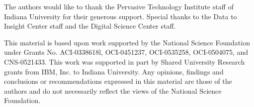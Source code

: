 \documentclass[10pt,conference]{IEEEtran}
\begin{document}
The authors would like to thank the Pervasive Technology Institute staff of Indiana University for their generous support. Special thanks to the Data to Insight Center staff and the Digital Science Center staff. 

This material is based upon work supported by the National Science Foundation under Grants No. ACI-0338618l, OCI-0451237, OCI-0535258, OCI-0504075, and CNS-0521433. This work was supported in part by Shared University Research grants from IBM, Inc. to Indiana University. Any opinions, findings and conclusions or recommendations expressed in this material are those of the authors and do not necessarily reflect the views of the National Science Foundation. 





\end{document}
